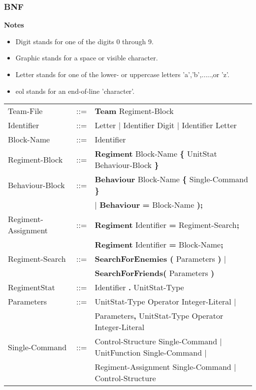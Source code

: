 	\subsubsection{BNF}
		{\bf Notes}
		\begin{itemize}
			\item Digit stands for one of the digits 0 through 9.
			\item Graphic stands for a space or visible character.
			\item Letter stands for one of the lower- or uppercase letters 'a','b',.....,or 'z'.
			\item eol stands for an end-of-line 'character'.
		\end{itemize}
		\begin{center}
				\begin{longtable}{ l l l }
				\endfirsthead
				\endhead
				Team-File		   &	::=	 & {\bf Team} Regiment-Block \\
				Identifier		   &    ::=  & Letter $\mid$ Identifier Digit $\mid$ Identifier Letter \\
				Block-Name		   &	::=  & Identifier							\\
				Regiment-Block     &	::=	 & {\bf Regiment} Block-Name {\bf \{ } UnitStat Behaviour-Block \bf{\} }\\
				Behaviour-Block	   &	::=	 & {\bf Behaviour} Block-Name {\bf \{} Single-Command {\bf \}}  \\
								   &         & $\mid$ {\bf Behaviour} {\bf = } Block-Name {\bf );} \\
				Regiment-Assignment&    ::=  &{\bf Regiment} Identifier {\bf =} Regiment-Search{\bf ;}\\
								   &         &{\bf Regiment} Identifier {\bf =} Block-Name{\bf ;}\\
				Regiment-Search	   &	::=	 &{\bf SearchForEnemies (} Parameters {\bf )} $\mid$\\
								   &		 & {\bf SearchForFriends(} Parameters {\bf )}	 \\
				RegimentStat 	   &	::=  & Identifier {\bf.} UnitStat-Type \\
				Parameters		   &	::=	 & UnitStat-Type Operator Integer-Literal $\mid$\\
								   &		 & Parameters{\bf ,} UnitStat-Type Operator Integer-Literal\\
				Single-Command     &	::=  & Control-Structure Single-Command $\mid$ UnitFunction Single-Command $\mid$ \\
								   &		 & Regiment-Assignment Single-Command $\mid$ Control-Structure \\

\end{longtable}
\end{center}
